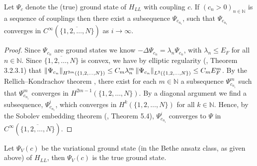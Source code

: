 	\begin{proposition}\label{PropositionCInftyconvergenceLLEigenstates}
		Let $ \Psi_c $ denote the (true) ground state of $ H_{LL} $ with coupling $ c $. If $ (c_n>0)_{n\in\mathbb{N}} $ is a sequence of couplings then there exist a subsequence $ \Psi_{c_{n_i}} $, such that $ \Psi_{c_{n_i}} $ converges in $ C^{\infty}(\overline{\{1,2,\ldots,N\}}) $ as $ i\to\infty $.
	\end{proposition}
	\begin{proof}
		Since $ \Psi_{c_n} $ are ground states we know $ -\Delta\Psi_{c_n}=\lambda_n \Psi_{c_n} $, with $ \lambda_n\leq E_F $ for all $ n\in\mathbb{N} $. Since $ \overline{\{1,2,\ldots,N\}} $ is convex, we have by elliptic regularity (\cite{grisvard2011elliptic}, Theorem 3.2.3.1) that $ \left\lVert \Psi_{c_n} \right\rVert_{H^{2m}(\{1,2,\ldots,N\})}\leq C_m \lambda_n^m \left\lVert \Psi_{c_n} \right\rVert_{L^2(\{1,2,\ldots,N\})}\leq C_m E_F^m $. By the Rellich--Kondrachov theorem \cite{adams1975sobolev}, there exist for each $ m\in\mathbb{N} $ a subsequence $ \Psi^m_{c_{n_i}} $ such that $ \Psi^m_{c_{n_i}} $ converges in $ H^{2m-1}(\{1,2,\ldots,N\}) $. By a diagonal argument we find a subsequence, $ \Psi^i_{c_{n_i}} $, which converges in $ H^k(\{1,2,\ldots,N\}) $ for all $ k\in\mathbb{N} $. Hence, by the Sobolev embedding theorem (\cite{adams1975sobolev}, Theorem 5.4), $ \Psi^i_{c_{n_i}} $ converges to $ \Psi $ in $ C^\infty(\overline{\{1,2,\ldots,N\}}) $.
	\end{proof}
	\begin{proposition}\label{PropositionLLGroundState}
		Let $ \Psi_V(c) $ be the variational ground state (in the Bethe ansatz class, as given above) of $ H_{LL} $, then $ \Psi_V(c) $ is the true ground state.
	\end{proposition} 
